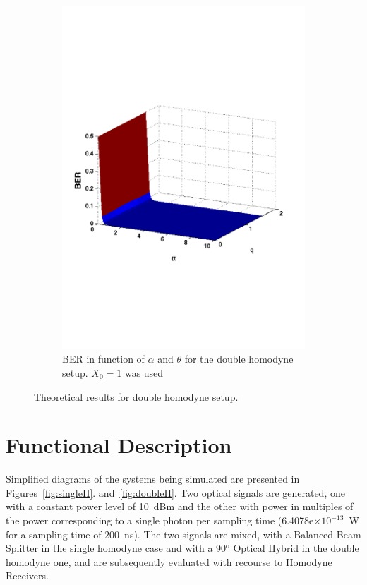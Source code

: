 \documentclass[a4paper]{article}
\begin{document}
\begin{figure}[h]
\begin{subfigure}{.48\linewidth}
\includegraphics[width=\linewidth, trim= 0mm 60mm 0mm 70mm]{doublehomodyneBER.pdf}
\caption{BER in function of $\alpha$ and $\theta$ for the double homodyne setup. $X_0=1$ was used}
\end{subfigure}
\caption{Theoretical results for double homodyne setup.}
\end{figure}

\section{Functional Description}

Simplified diagrams of the systems being simulated are presented in Figures~\ref{fig:singleH}. and~\ref{fig:doubleH}. Two optical signals are generated, one with a constant power level of 10~dBm and the other with power in multiples of the power corresponding to a single photon per sampling time (6.4078e$\times10^{-13}$~W for a sampling time of 200~ns). The two signals are mixed, with a Balanced Beam Splitter in the single homodyne case and with a 90$^\text{o}$ Optical Hybrid in the double homodyne one, and are subsequently evaluated with recourse to Homodyne Receivers.
\end{document}
